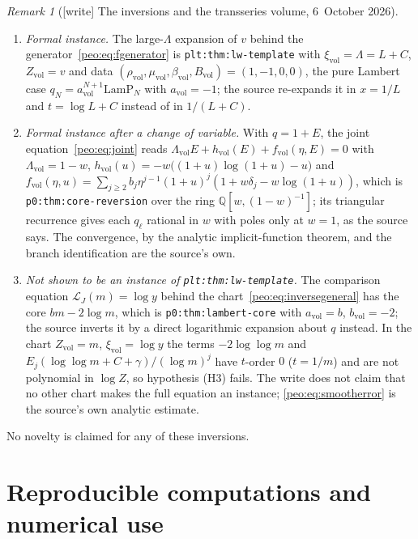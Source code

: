 \documentclass[11pt]{article}
\numberwithin{equation}{section}
\theoremstyle{remark}\newtheorem{remark}[theorem]{Remark}
\newcommand{\Li}{\mathcal L}
\DeclareMathOperator{\Ree}{Re}
\newcommand{\file}[1]{\nolinkurl{#1}}
\begin{document}
\begin{remark}[{[write]} The inversions and the transseries volume, 6~October 2026]
\begin{enumerate}[label=(\alph*)]
 the large one $-W_{-1}(-e^{-\Lambda})=-W_{-1}(-e^{-C}s)$, the source's
 branch; the threshold $1$ is the source's condition $\Ree\Lambda>1$ on
 $D_s$. The complex continuation by the contraction argument is the
 source's own.
\item \emph{Formal instance.} The large-$\Lambda$ expansion of $v$ behind the
 generator~\eqref{peo:eq:fgenerator} is \file{plt:thm:lw-template} with
 $\xi_{\mathrm{vol}}=\Lambda=L+C$, $Z_{\mathrm{vol}}=v$ and data
 $(\rho_{\mathrm{vol}},\mu_{\mathrm{vol}},\beta_{\mathrm{vol}},B_{\mathrm{vol}})=(1,-1,0,0)$,
 the pure Lambert case $q_N=a_{\mathrm{vol}}^{N+1}\mathrm{LamP}_N$ with
 $a_{\mathrm{vol}}=-1$; the source re-expands it in $x=1/L$ and
 $t=\log L+C$ instead of in $1/(L+C)$.
\item \emph{Formal instance after a change of variable.} With $q=1+E$, the
 joint equation~\eqref{peo:eq:joint} reads
 $\Lambda_{\mathrm{vol}}E+h_{\mathrm{vol}}(E)+f_{\mathrm{vol}}(\eta,E)=0$
 with $\Lambda_{\mathrm{vol}}=1-w$,
 $h_{\mathrm{vol}}(u)=-w\bigl((1+u)\log(1+u)-u\bigr)$ and
 $f_{\mathrm{vol}}(\eta,u)=\sum_{j\ge2}b_j\eta^{j-1}(1+u)^j(1+w\delta_j-w\log(1+u))$,
 which is \file{p0:thm:core-reversion} over the ring
 $\mathbb Q[w,(1-w)^{-1}]$; its triangular recurrence gives each $q_\ell$
 rational in $w$ with poles only at $w=1$, as the source says. The
 convergence, by the analytic implicit-function theorem, and the branch
 identification are the source's own.
\item \emph{Not shown to be an instance of \file{plt:thm:lw-template}.} The
 comparison equation $\Li_J(m)=\log y$ behind the chart~\eqref{peo:eq:inversegeneral}
 has the core $bm-2\log m$, which is \file{p0:thm:lambert-core} with
 $a_{\mathrm{vol}}=b$, $b_{\mathrm{vol}}=-2$; the source inverts it by a
 direct logarithmic expansion about $q$ instead. In the chart
 $Z_{\mathrm{vol}}=m$, $\xi_{\mathrm{vol}}=\log y$ the terms $-2\log\log m$
 and $E_j(\log\log m+C+\gamma)/(\log m)^j$ have $t$-order $0$ ($t=1/m$) and
 are not polynomial in $\log Z$, so hypothesis (H3) fails. The write does
 not claim that no other chart makes the full equation an instance;
 \eqref{peo:eq:smootherror} is the source's own analytic estimate.
\end{enumerate}
No novelty is claimed for any of these inversions.
\end{remark}

\section{Reproducible computations and numerical use}\label{peo:sec:companion}
\end{document}
